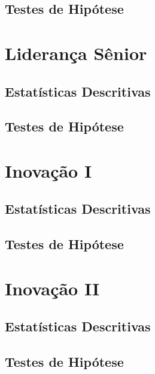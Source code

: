 \documentclass[]{book}
\begin{document}
\hypertarget{testes-de-hipotese-11}{%
\subsection{Testes de Hipótese}\label{testes-de-hipotese-11}}

\hypertarget{lideranca-senior-1}{%
\section{Liderança Sênior}\label{lideranca-senior-1}}

\hypertarget{estatisticas-descritivas-12}{%
\subsection{Estatísticas Descritivas}\label{estatisticas-descritivas-12}}

\hypertarget{testes-de-hipotese-12}{%
\subsection{Testes de Hipótese}\label{testes-de-hipotese-12}}

\hypertarget{inovacao-i}{%
\section{Inovação I}\label{inovacao-i}}

\hypertarget{estatisticas-descritivas-13}{%
\subsection{Estatísticas Descritivas}\label{estatisticas-descritivas-13}}

\hypertarget{testes-de-hipotese-13}{%
\subsection{Testes de Hipótese}\label{testes-de-hipotese-13}}

\hypertarget{inovacao-ii}{%
\section{Inovação II}\label{inovacao-ii}}

\hypertarget{estatisticas-descritivas-14}{%
\subsection{Estatísticas Descritivas}\label{estatisticas-descritivas-14}}

\hypertarget{testes-de-hipotese-14}{%
\subsection{Testes de Hipótese}\label{testes-de-hipotese-14}}


\end{document}

